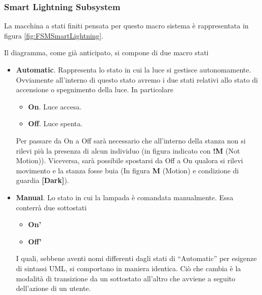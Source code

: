 \documentclass[a4paper,12pt]{report}
\begin{document}
\subsubsection{Smart Lightning Subsystem}
La macchina a stati finiti pensata per questo macro sistema è rappresentata in figura \ref{fig:FSMSmartLightning}.

Il diagramma, come già anticipato, si compone di due macro stati 
\begin{itemize}
    \item \textbf{Automatic}. Rappresenta lo stato in cui la luce si gestisce autonomamente. Ovviamente all'interno di questo stato avremo i due stati relativi allo stato di accensione o spegnimento della luce. In particolare 
    \begin{itemize}
        \item \textbf{On}. Luce accesa.
        \item \textbf{Off}. Luce spenta.
    \end{itemize}
    Per passare da On a Off sarà necessario che all'interno della stanza non si rilevi più la presenza di alcun individuo (in figura indicato con \textbf{!M} (Not Motion)). Viceversa, sarà possibile spostarsi da Off a On qualora si rilevi movimento e la stanza fosse buia (In figura \textbf{M} (Motion) e condizione di guardia \textbf{[Dark]}). 
    \item \textbf{Manual}. Lo stato in cui la lampada è comandata manualmente. Essa conterrà due sottostati 
    \begin{itemize}
        \item \textbf{On'}
        \item \textbf{Off'}
    \end{itemize}
    I quali, sebbene aventi nomi differenti dagli stati di ``Automatic'' per esigenze di sintassi UML, si comportano in maniera identica. 
    Ciò che cambia è la modalità di transizione da un sottostato all'altro che avviene a seguito dell'azione di un utente.
\end{itemize}
\end{document}
